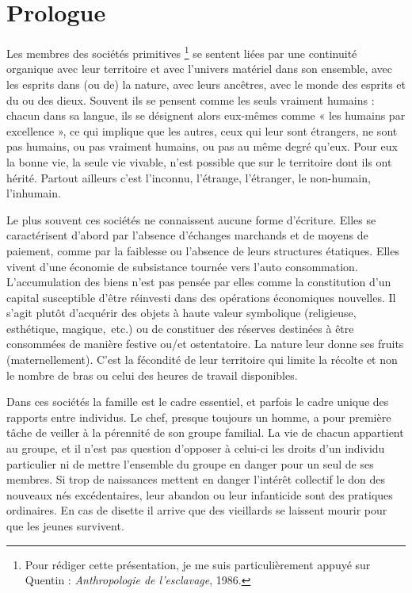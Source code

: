 

\chapter{Prologue}


Les membres des sociétés primitives%
\footnote{Pour rédiger cette présentation, je me suis particulièrement appuyé sur
Quentin  : \emph{Anthropologie de l'esclavage}, 1986.}
se sentent liées par une 
continuité organique avec leur territoire et avec l'univers matériel dans 
son ensemble, avec les esprits dans (ou de) la nature, avec leurs ancêtres, 
avec le monde des esprits et du ou des dieux. Souvent ils se pensent 
comme les seuls vraiment humains : chacun dans sa langue, ils se 
désignent alors eux-mêmes comme « les humains par excellence », ce
qui implique que les autres, ceux qui leur sont étrangers, ne sont pas humains, 
ou pas vraiment humains, ou pas au même degré qu'eux. Pour eux la 
bonne vie, la seule vie vivable, n'est possible que sur le territoire dont ils 
ont hérité. Partout ailleurs c'est l'inconnu, l'étrange, l'étranger, le
non-humain, l'inhumain.

Le plus souvent ces sociétés ne connaissent aucune forme
d'écriture. Elles se caractérisent d'abord par l'absence d'échanges marchands et 
de moyens de paiement, comme par la faiblesse ou l'absence de leurs 
structures étatiques. Elles vivent d'une économie de subsistance tournée 
vers l'auto consommation. L'accumulation des biens n'est pas pensée par 
elles comme la constitution d'un capital susceptible d'être réinvesti dans 
des opérations économiques nouvelles. Il s'agit plutôt d'acquérir des
objets à haute valeur symbolique (religieuse, esthétique, magique,~etc.) ou 
de constituer des réserves destinées à être consommées de manière
festive ou/et ostentatoire. La nature leur donne ses fruits (maternellement). 
C'est la fécondité de leur territoire qui limite la récolte et non le nombre
de bras ou celui des heures de travail disponibles.

Dans ces sociétés la famille est le cadre essentiel, et parfois le
cadre unique des rapports entre individus. Le chef, presque toujours un 
homme, a pour première tâche de veiller à la pérennité de son groupe 
familial. La vie de chacun appartient au groupe, et il n'est pas question 
d'opposer à celui-ci les droits d'un individu particulier ni de mettre
l'ensemble du groupe en danger pour un seul de ses membres. Si trop de 
naissances mettent en danger l'intérêt collectif le don des nouveaux nés 
excédentaires, leur abandon ou leur infanticide sont des pratiques
ordinaires. En cas de disette il arrive que des vieillards se laissent mourir 
pour que les jeunes survivent.

